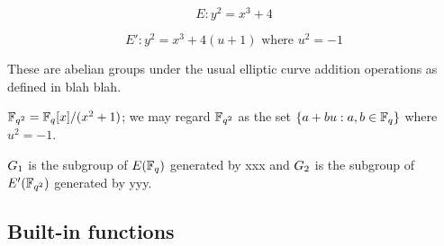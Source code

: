 $$
E: y^2 = x^3 + 4
$$

$$
E': y^2 = x^3 + 4(u+1) \mbox{ where $u^2=-1$}
$$

These are abelian groups under the usual elliptic curve addition operations as defined in blah blah.

$\mathbb{F}_{q^2} = \mathbb{F}_q[x]/(x^2+1)$; we may regard $\mathbb{F}_{q^2}$ as the set $\{a+bu: a,b \in \mathbb{F}_q\}$ where $u^2=-1$.

$G_1$ is the subgroup of $E(\mathbb{F}_q)$ generated by xxx and $G_2$ is the subgroup of $E'(\mathbb{F}_{q^2})$ generated by yyy.






\subsection{Built-in functions}
\label{sec:future-built-in-functions}

